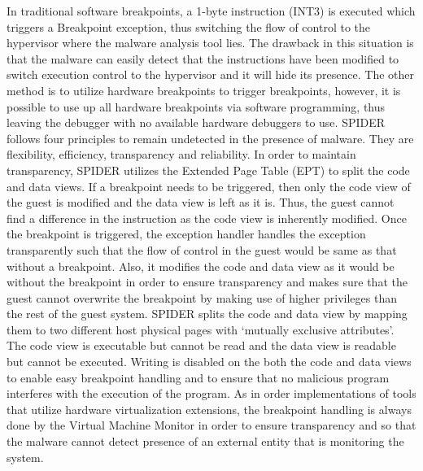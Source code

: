 \documentclass[11pt]{article}
\begin{document}
	In traditional software breakpoints, a 1-byte instruction (INT3) is executed which triggers a Breakpoint exception, thus switching the flow of control to the hypervisor where the malware analysis tool lies. The drawback in this situation is that the malware can easily detect that the instructions have been modified to switch execution control to the hypervisor and it will hide its presence. The other method is to utilize hardware breakpoints to trigger breakpoints, however, it is possible to use up all hardware breakpoints via software programming, thus leaving the debugger with no available hardware debuggers to use. SPIDER follows four principles to remain undetected in the presence of malware. They are flexibility, efficiency, transparency and reliability. In order to maintain transparency, SPIDER utilizes the Extended Page Table (EPT) to split the code and data views. If a breakpoint needs to be triggered, then only the code view of the guest is modified and the data view is left as it is. Thus, the guest cannot find a difference in the instruction as the code view is inherently modified. Once the breakpoint is triggered, the exception handler handles the exception transparently such that the flow of control in the guest would be same as that without a breakpoint. Also, it modifies the code and data view as it would be without the breakpoint in order to ensure transparency and makes sure that the guest cannot overwrite the breakpoint by making use of higher privileges than the rest of the guest system. SPIDER splits the code and data view by mapping them to two different host physical pages with ‘mutually exclusive attributes’. The code view is executable but cannot be read and the data view is readable but cannot be executed. Writing is disabled on the both the code and data views to enable easy breakpoint handling and to ensure that no malicious program interferes with the execution of the program. As in order implementations of tools that utilize hardware virtualization extensions, the breakpoint handling is always done by the Virtual Machine Monitor in order to ensure transparency and so that the malware cannot detect presence of an external entity that is monitoring the system. \\ \\
\end{document}
